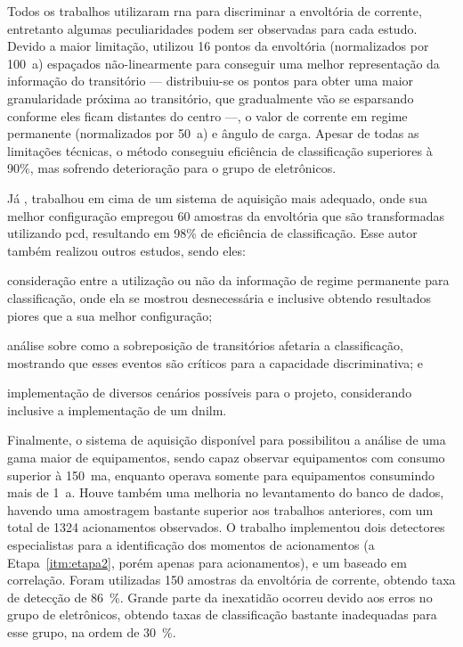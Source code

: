 Todos os trabalhos utilizaram \gls{rna} para discriminar a envoltória
de corrente, entretanto algumas peculiaridades podem ser observadas
para cada estudo. Devido a maior limitação, \citet*{nilm_cepel_aguiar}
utilizou 16 pontos da envoltória (normalizados por 100~\acs{a})
espaçados não-linearmente para conseguir uma melhor representação da
informação do transitório --- distribuiu-se os pontos para obter uma
maior granularidade próxima ao transitório, que gradualmente vão se
esparsando conforme eles ficam distantes do centro ---, o valor de
corrente em regime permanente (normalizados por 50~\acs{a}) e
ângulo de carga. Apesar de todas as limitações técnicas, o método
conseguiu eficiência de classificação superiores à 90\%, mas sofrendo
deterioração para o grupo de eletrônicos. 

Já \citet{nilm_cepel_bezerra}, trabalhou em cima de um sistema
de aquisição mais adequado, onde sua melhor configuração empregou 60 amostras
da envoltória que são transformadas utilizando \gls{pcd}, resultando
em 98\% de eficiência de classificação.  Esse autor também realizou
outros estudos, sendo eles:
\begin{enumerate*}[label=\itshape\alph*\upshape)] 
\item consideração entre a utilização ou não da informação de regime
permanente para classificação, onde ela se mostrou desnecessária e
inclusive obtendo resultados piores que a sua melhor configuração; 
\item análise sobre como a sobreposição de transitórios afetaria a
classificação, mostrando que esses eventos são críticos para a
capacidade discriminativa; e 
\item implementação de diversos cenários possíveis para o projeto,
considerando inclusive a implementação de um \gls{dnilm}.  
\end{enumerate*}

Finalmente, o sistema de aquisição disponível para
\citet*{nilm_cepel_alvaro} possibilitou a análise de uma gama
maior de equipamentos, sendo capaz observar equipamentos com
consumo superior à 150~m\acs{a}, enquanto
\citet*{nilm_cepel_aguiar} operava somente para equipamentos consumindo
mais de 1~\acs{a}. Houve também uma melhoria no
levantamento do banco de dados, havendo uma amostragem bastante
superior aos trabalhos anteriores, com um total de 1324 acionamentos
observados. O trabalho implementou dois detectores especialistas para
a identificação dos momentos de acionamentos (a
Etapa~\ref{itm:etapa2}, porém apenas para acionamentos), e um baseado
em correlação. Foram utilizadas 150 amostras da envoltória de
corrente, obtendo taxa de detecção de 86~\%.  Grande parte da
inexatidão ocorreu devido aos erros no grupo de eletrônicos, obtendo
taxas de classificação bastante inadequadas para esse grupo, na ordem
de 30~\%.

